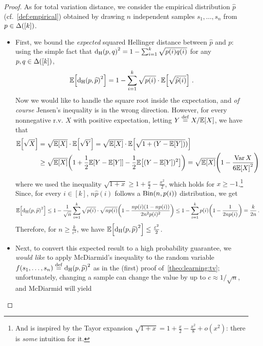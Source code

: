 \documentclass[10pt]{article}
\newcommand{\dst}{\varepsilon}
\newcommand{\ab}{k}
\newcommand{\ns}{n}
\begin{document}
\begin{proof}
    As for total variation distance, we consider the empirical distribution $\widehat{p}$ (cf.~\eqref{def:empirical}) obtained by drawing $\ns$ independent samples $s_1,\dots,s_\ns$ from $p\in\distribs{[\ab]}$.
    
    \begin{itemize}
      \item First, we bound the \emph{expected} squared Hellinger distance between $\widehat{p}$ and $p$: using the simple fact that
      $\hellinger{p}{q}^2 = 1-\sum_{i=1}^\ab \sqrt{p(i)q(i)}$ for any $p,q\in\distribs{[\ab]}$,
      \[
          \expect{ \hellinger{p}{\widehat{p}}^2 } = 1-\sum_{i=1}^\ab \sqrt{p(i)}\cdot \expect{\sqrt{\widehat{p}(i)}}\,.
      \]
      Now we would like to handle the square root inside the expectation, and \emph{of course} Jensen's inequality is in the wrong direction. However, for every nonnegative r.v. $X$ with positive expectation, letting $Y\stackrel{\rm def}{=} X/\mathbb{E}\!\left[X\right]$, we have that
      \begin{align*}
          \expect{\sqrt{X}} 
          &= \sqrt{\expect{X}}\cdot\expect{\sqrt{Y}}
          = \sqrt{\expect{X}}\cdot\expect{\sqrt{1+(Y-\expect{Y})})} \\
          &\geq \sqrt{\expect{X}} \mleft( 1+ \frac{1}{2}\expect{Y-\expect{Y}} - \frac{1}{2} \expect{(Y-\expect{Y})^2} \mright)
          = \sqrt{\expect{X}}\mleft(1-\frac{\var X}{6\expect{X}^2}\mright)
      \end{align*}
      where we used the inequality $\sqrt{1+x} \geq 1+\frac{x}{2}-\frac{x^2}{2}$, which holds for $x\geq -1$.\footnote{And is inspired by the Tayor expansion $\sqrt{1+x} = 1+\frac{x}{2} - \frac{x^2}{8} +o(x^2)$: there is \emph{some} intuition for it.}{} Since, for every $i\in[\ab]$, $\ns\widehat{p}(i)$ follows a $\binomial{\ns}{p(i)}$ distribution, we get
      \[
          \expect{ \hellinger{p}{\widehat{p}}^2 } \leq 1-\frac{1}{\sqrt{\ns}}\sum_{i=1}^\ab \sqrt{p(i)}\cdot\sqrt{\ns p(i)} \mleft(1-\frac{\ns p(i)(1-\ns p(i))}{2\ns^2 p(i)^2}\mright)
          \leq 1 - \sum_{i=1}^\ab p(i) \mleft(1-\frac{1}{2\ns p(i)}\mright) = \frac{\ab}{2\ns}\,.
      \]
      Therefore, for $\ns\geq \frac{\ab}{\dst^2}$, we have $\expect{ \hellinger{p}{\widehat{p}}^2 }\leq \frac{\dst^2}{2}$.
      \item Next, to convert this expected result to a high probability guarantee, we \emph{would like} to apply McDiarmid's inequality to the random variable $f(s_1,\dots,s_\ns) \eqdef \hellinger{p}{\widehat{p}}^2$ as in the (first) proof of~\autoref{theo:learning:tv}; unfortunately, changing a sample can change the value by up to $c \approx 1/\sqrt{\ns}$, and McDiarmid will yield

\end{itemize}
\end{proof}
\end{document}
